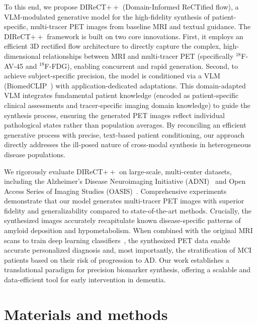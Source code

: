 \documentclass[a4paper]{cas-sc}
\begin{document}
To this end, we propose DIReCT$++$ (Domain-Informed ReCTified flow), a VLM-modulated generative model for the high-fidelity synthesis of patient-specific, multi-tracer PET images from baseline MRI and textual guidance. The DIReCT$++$ framework is built on two core innovations. First, it employs an efficient 3D rectified flow architecture to directly capture the complex, high-dimensional relationships between MRI and multi-tracer PET (specifically $^{18}$F-AV-45 and $^{18}$F-FDG), enabling concurrent and rapid generation. Second, to achieve subject-specific precision, the model is conditioned via a VLM (BiomedCLIP~\citep{zhang2025multimodal}) with application-dedicated adaptations. This domain-adapted VLM integrates fundamental patient knowledge (encoded as patient-specific clinical assessments and tracer-specific imaging domain knowledge) to guide the synthesis process, ensuring the generated PET images reflect individual pathological states rather than population averages. By reconciling an efficient generative process with precise, text-based patient conditioning, our approach directly addresses the ill-posed nature of cross-modal synthesis in heterogeneous disease populations.

We rigorously evaluate DIReCT$++$ on large-scale, multi-center datasets, including the Alzheimer's Disease Neuroimaging Initiative (ADNI)~\citep{weiner2010alzheimer} and Open Access Series of Imaging Studies (OASIS)~\citep{lamontagne2019oasis}. Comprehensive experiments demonstrate that our model generates multi-tracer PET images with superior fidelity and generalizability compared to state-of-the-art methods. Crucially, the synthesized images accurately recapitulate known disease-specific patterns of amyloid deposition and hypometabolism. When combined with the original MRI scans to train deep learning classifiers~\citep{lian2018hierarchical,huang2017densely}, the synthesized PET data enable accurate personalized diagnosis and, most importantly, the stratification of MCI patients based on their risk of progression to AD. Our work establishes a translational paradigm for precision biomarker synthesis, offering a scalable and data-efficient tool for early intervention in dementia.
\section{Materials and methods}\label{sec4}
\end{document}
